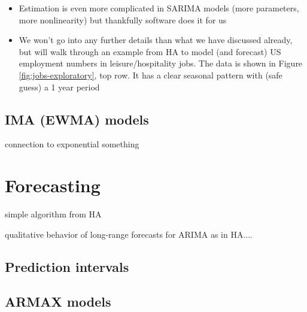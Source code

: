 \documentclass{article}
\begin{document}
\begin{itemize}
\item Estimation is even more complicated in SARIMA models (more parameters, 
  more nonlinearity) but thankfully software does it for us

\item We won't go into any further details than what we have discussed already,
  but will walk through an example from HA to model (and forecast) US
  employment numbers in leisure/hospitality jobs. The data is shown in Figure
  \ref{fig:jobs-exploratory}, top row. It has a clear seasonal pattern with
  (safe guess) a 1 year period 
\end{itemize}

\subsection{IMA (EWMA) models}

connection to exponential something

\section{Forecasting}

simple algorithm from HA

qualitative behavior of long-range forecasts for ARIMA as in HA....

\subsection{Prediction intervals}

\subsection{ARMAX models}
\end{document}
